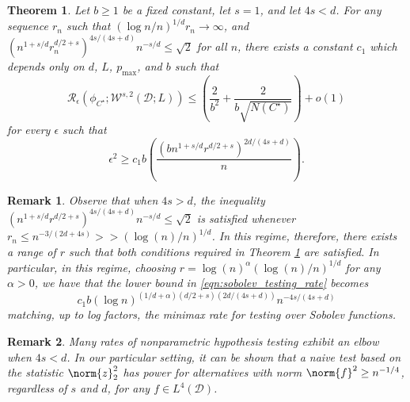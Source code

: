 \documentclass{article}
\newcommand{\1}{\mathbf{1}}
\theoremstyle{alden}
\theoremstyle{aldenthm}
\newtheorem{theorem}{Theorem}
\newtheorem{remark}{Remark}
\theoremstyle{definition}
\theoremstyle{remark}
\begin{document}
\begin{theorem}
	\label{thm:sobolev_testing_rate}
	Let $b \geq 1$ be a fixed constant, let $s = 1$, and let $4s < d$. For any sequence $r_n$ such that $(\log n/n)^{1/d}r_n \to \infty$, and $(n^{1 + s/d}r_n^{d/2 + s})^{4s/(4s + d)}n^{-s/d} \leq \sqrt{2}$ for all $n$, there exists a constant $c_1$ which depends only on $d$, $L$, $p_{\max}$, and $b$ such that
	\begin{equation}
	\label{eqn:sobolev_testing_rate_1}
	\mathcal{R}_{\epsilon}(\phi_{C^{\star}}; \mathcal{W}^{s,2}(\mathcal{D};L)) \leq \left(\frac{2}{b^2} + \frac{2}{b\sqrt{N(C^{\star})}}\right) + o(1)
	\end{equation}
	for every $\epsilon$ such that
	\begin{equation}
	\label{eqn:sobolev_testing_rate}
	\epsilon^2 \geq c_1 b \left(\frac{(b n^{1 + s/d}r^{d/2 + s})^{2d/(4s + d)}}{n}\right).
	\end{equation}
\end{theorem}
\begin{remark}
	Observe that when $4s > d$, the inequality $(n^{1 + s/d}r^{d/2 + s})^{4s/(4s + d)}n^{-s/d} \leq \sqrt{2}$ is satisfied whenever $r_n \leq n^{-3/(2d + 4s)} >> (\log(n)/n)^{1/d}$. In this regime, therefore, there exists a range of $r$ such that both conditions required in Theorem \ref{thm:sobolev_testing_rate} are satisfied. In particular, in this regime, choosing $r = \log(n)^{\alpha} (\log(n)/n)^{1/d}$ for any $\alpha > 0$, we have that the lower bound in \eqref{eqn:sobolev_testing_rate} becomes
	\begin{equation*}
	c_1 b (\log n)^{(1/d + \alpha)(d/2 + s)(2d/(4s + d))} n^{-4s/(4s + d)}
	\end{equation*}
	matching, up to log factors, the minimax rate for testing over Sobolev functions.
\end{remark}
\begin{remark}
	Many rates of nonparametric hypothesis testing exhibit an elbow when $4s < d$. In our particular setting, it can be shown that a naive test based on the statistic $\norm{z}_2^2$ has power for alternatives with norm $\norm{f}^2 \geq n^{-1/4}$, regardless of $s$ and $d$, for any $f \in L^4(\mathcal{D})$. 
\end{remark}
\end{document}
